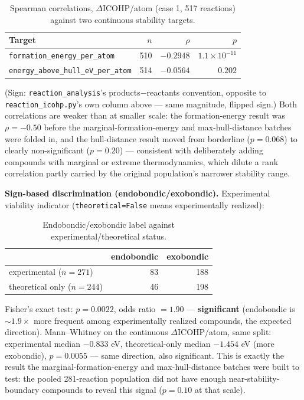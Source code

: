 \documentclass[11pt,a4paper]{article}
\begin{document}
\begin{table}[htbp]
\centering
\caption{Spearman correlations, $\Delta$ICOHP/atom (case 1, 517 reactions) against two continuous stability targets.}
\label{tab:pooled-targets}
\begin{tabular}{@{}lrrr@{}}
\toprule
Target & $n$ & $\rho$ & $p$ \\
\midrule
\texttt{formation\_energy\_per\_atom} & 510 & $-0.2948$ & $1.1\times10^{-11}$ \\
\texttt{energy\_above\_hull\_eV\_per\_atom} & 514 & $-0.0564$ & $0.202$ \\
\bottomrule
\end{tabular}
\end{table}

(Sign: \texttt{reaction\_analysis}'s products$-$reactants convention,
opposite to \texttt{reaction\_icohp.py}'s own column above --- same
magnitude, flipped sign.) Both correlations are weaker than at smaller
scale: the formation-energy result was $\rho=-0.50$ before the
marginal-formation-energy and max-hull-distance batches were folded in,
and the hull-distance result moved from borderline ($p=0.068$) to
clearly non-significant ($p=0.20$) --- consistent with deliberately
adding compounds with marginal or extreme thermodynamics, which dilute
a rank correlation partly carried by the original population's narrower
stability range.

\textbf{Sign-based discrimination (endobondic/exobondic).} Experimental
viability indicator (\texttt{theoretical=False} means experimentally
realized):

\begin{table}[htbp]
\centering
\caption{Endobondic/exobondic label against experimental/theoretical status.}
\label{tab:fisher}
\begin{tabular}{@{}lrr@{}}
\toprule
 & endobondic & exobondic \\
\midrule
experimental ($n=271$) & 83 & 188 \\
theoretical only ($n=244$) & 46 & 198 \\
\bottomrule
\end{tabular}
\end{table}

Fisher's exact test: $p=0.0022$, odds ratio $=1.90$ ---
\textbf{significant} (endobondic is $\sim 1.9\times$ more frequent among
experimentally realized compounds, the expected direction).
Mann--Whitney on the continuous $\Delta$ICOHP/atom, same split:
experimental median $-0.833$ eV, theoretical-only median $-1.454$ eV
(more exobondic), $p=0.0055$ --- same direction, also significant. This
is exactly the result the marginal-formation-energy and max-hull-distance
batches were built to test: the pooled 281-reaction population did not
have enough near-stability-boundary compounds to reveal this signal
($p=0.10$ at that scale).
\end{document}
